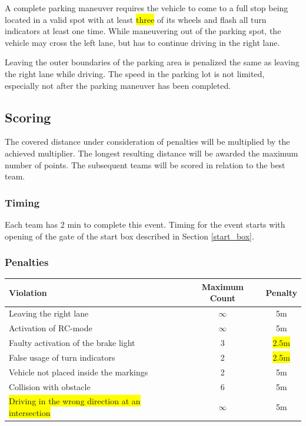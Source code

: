 \documentclass[a4paper]{report}
\begin{document}
{A complete parking maneuver requires the vehicle to come to a full stop being located in a valid spot with at least \colorbox{yellow}{three} of its wheels and flash all turn indicators at least one time. While maneuvering out of the parking spot, the vehicle may cross the left lane, but has to continue driving in the right lane. 

Leaving the outer boundaries of the parking area is penalized the same as leaving the right lane while driving. The speed in the parking lot is not limited, especially not after the parking maneuver has been completed. 

\subsection{Scoring}
\label{freedrive_scoring}

The covered distance under consideration of penalties will be multiplied by the achieved multiplier. The longest resulting distance will be awarded the maximum number of points. The subsequent teams will be scored in relation to the best team. 

\subsubsection{Timing}

Each team has 2 min to complete this event. Timing for the event starts with opening of the gate of the start box described in Section \ref{start_box}. 

\subsubsection{Penalties}
\label{freedrive_penalties}

\begin{table}[H]
\begin{tabular}{@{}lcc@{}}
\toprule
\textbf{Violation}                     			& \textbf{Maximum Count} & \textbf{Penalty} \\ \midrule
Leaving the right lane                 			& $\infty$               & 5m               \\
Activation of RC-mode                  			& $\infty$               & 5m               \\
Faulty activation of the brake light       	    & 3                      & \colorbox{yellow}{2.5m}       \\
False usage of turn indicators         			& 2                      & \colorbox{yellow}{2.5m}               \\
Vehicle not placed inside the markings 			& 2                      & 5m               \\
Collision with obstacle                			& 6                      & 5m               \\ 
\colorbox{yellow}{Driving in the wrong direction at an intersection}	& $\infty$               & 5m               \\\bottomrule
\end{tabular}
\end{table}

}
\end{document}
